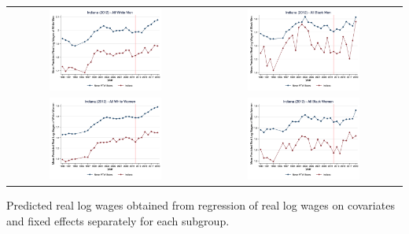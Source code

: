 \documentclass[11pt]{article}
\begin{document}
{\pagebreak
\begin{landscape}
\begin{table}[h!]
    \centering
    \label{fig:pta_in}
    \begin{tabular}{c c}
          \includegraphics[width = 0.6\textwidth, keepaspectratio]{figures/pta/fin_wm_in.png} & \includegraphics[width = 0.6\textwidth, keepaspectratio]{figures/pta/fin_bm_in.png} \\
          \includegraphics[width = 0.6\textwidth, keepaspectratio]{figures/pta/fin_wf_in.png} & \includegraphics[width = 0.6\textwidth, keepaspectratio]{figures/pta/fin_bf_in.png}
    \end{tabular}
\end{table}
\footnotesize{Predicted real log wages obtained from regression of real log wages on covariates and fixed effects separately for each subgroup.}
\end{landscape}

}
\end{document}
